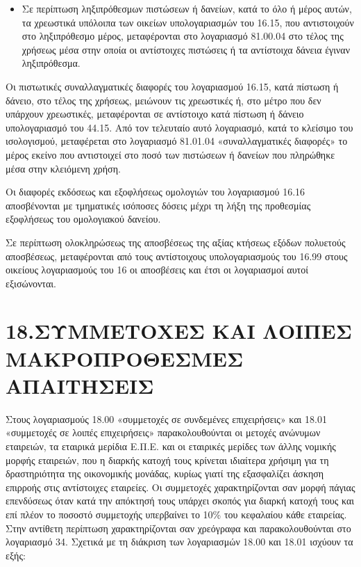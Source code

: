 \documentclass[A4,10pt,greek]{book}
\begin{document}
\begin{enumerate}
\begin{itemize}
\item Σε περίπτωση ληξιπρόθεσμων πιστώσεων ή δανείων, κατά το όλο ή μέρος αυτών, τα χρεωστικά υπόλοιπα των οικείων υπολογαριασμών του 16.15, που αντιστοιχούν στο ληξιπρόθεσμο μέρος, μεταφέρονται στο λογαριασμό 81.00.04 στο τέλος της χρήσεως μέσα στην οποία οι αντίστοιχες πιστώσεις ή τα αντίστοιχα δάνεια έγιναν ληξιπρόθεσμα.

\end{itemize}

Οι πιστωτικές συναλλαγματικές διαφορές του λογαριασμού 16.15, κατά πίστωση ή δάνειο, στο τέλος της χρήσεως, μειώνουν τις χρεωστικές ή, στο μέτρο που δεν υπάρχουν χρεωστικές, μεταφέρονται σε αντίστοιχο κατά πίστωση ή δάνειο υπολογαριασμό του 44.15. Από τον τελευταίο αυτό λογαριασμό, κατά το κλείσιμο του ισολογισμού, μεταφέρεται στο λογαριασμό 81.01.04 «συναλλαγματικές διαφορές» το μέρος εκείνο που αντιστοιχεί στο ποσό των πιστώσεων ή δανείων που πληρώθηκε μέσα στην κλειόμενη χρήση.

Οι διαφορές εκδόσεως και εξοφλήσεως ομολογιών του λογαριασμού 16.16 αποσβένονται με τμηματικές ισόποσες δόσεις μέχρι τη λήξη της προθεσμίας εξοφλήσεως του ομολογιακού δανείου.

Σε περίπτωση ολοκληρώσεως της αποσβέσεως της αξίας κτήσεως εξόδων πολυετούς αποσβέσεως, μεταφέρονται από τους αντίστοιχους υπολογαριασμούς του 16.99 στους οικείους λογαριασμούς του 16 οι αποσβέσεις και έτσι οι λογαριασμοί αυτοί εξισώνονται. 

\end{enumerate}

\section{18.ΣΥΜΜΕΤΟΧΕΣ ΚΑΙ ΛΟΙΠΕΣ ΜΑΚΡΟΠΡΟΘΕΣΜΕΣ ΑΠΑΙΤΗΣΕΙΣ}

Στους λογαριασμούς 18.00 «συμμετοχές σε συνδεμένες επιχειρήσεις» και 18.01 «συμμετοχές σε λοιπές επιχειρήσεις» παρακολουθούνται οι μετοχές ανώνυμων εταιρειών, τα εταιρικά μερίδια Ε.Π.Ε. και οι εταιρικές μερίδες των άλλης νομικής μορφής εταιρειών, που η διαρκής κατοχή τους κρίνεται ιδιαίτερα χρήσιμη για τη δραστηριότητα της οικονομικής μονάδας, κυρίως γιατί της εξασφαλίζει άσκηση επιρροής στις αντίστοιχες εταιρείες. Οι συμμετοχές χαρακτηρίζονται σαν μορφή πάγιας επενδύσεως όταν κατά την απόκτησή τους υπάρχει σκοπός για διαρκή κατοχή τους και επί πλέον το ποσοστό συμμετοχής υπερβαίνει το 10\% του κεφαλαίου κάθε εταιρείας. Στην αντίθετη περίπτωση χαρακτηρίζονται σαν χρεόγραφα και παρακολουθούνται στο λογαριασμό 34. Σχετικά με τη διάκριση των λογαριασμών 18.00 και 18.01 ισχύουν τα εξής:
\end{document}
